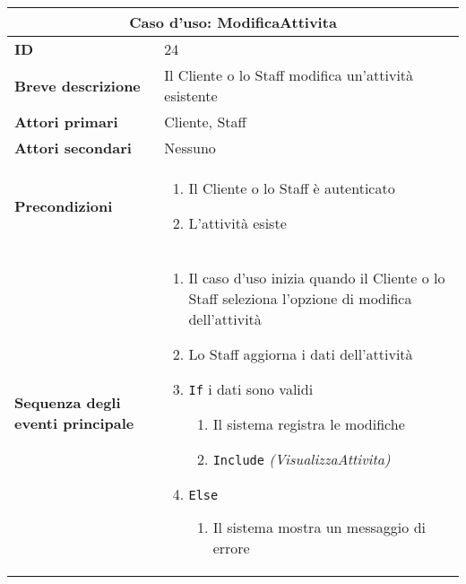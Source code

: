 \documentclass[a4paper]{report}
\begin{document}
\clearpage
\begin{table}[H]
\vspace*{-0cm}
\renewcommand{\arraystretch}{1.9}
\begin{tabular}{|p{3.9cm}|p{9.9cm}|}
\hline
\multicolumn{2}{|c|}{\textbf{Caso d’uso: ModificaAttivita}} \\ \hline
	\textbf{ID} & 24 \\ \hline
	\textbf{Breve descrizione} & Il Cliente o lo Staff modifica un’attività esistente \\ \hline
	\textbf{Attori primari} & Cliente, Staff \\ \hline
	\textbf{Attori secondari} & Nessuno \\ \hline
	\textbf{Precondizioni} & \begin{enumerate}[leftmargin=14pt,label=\arabic*.,labelsep=0.5em,topsep=0pt,partopsep=0pt,parsep=0pt,itemsep=0pt]
    \item Il Cliente o lo Staff è autenticato
    \item L’attività esiste
\end{enumerate} \\ \hline
	\textbf{Sequenza degli eventi principale} & \begin{enumerate}[leftmargin=14pt,label=\arabic*.,labelsep=0.5em,topsep=0pt,partopsep=0pt,parsep=0pt,itemsep=0pt]
    \item Il caso d'uso inizia quando il Cliente o lo Staff seleziona l'opzione di modifica dell'attività
    \item Lo Staff aggiorna i dati dell’attività
    \item \texttt{If} i dati sono validi
    \begin{enumerate}[label=\arabic{enumi}.\arabic*.,leftmargin=22pt,labelsep=0.5em,topsep=0pt,partopsep=0pt,parsep=0pt,itemsep=0pt]
        \item Il sistema registra le modifiche
        \item \texttt{Include} \textit{(VisualizzaAttivita)}
    \end{enumerate}
    \item \texttt{Else}
    \begin{enumerate}[label=\arabic{enumi}.\arabic*.,leftmargin=22pt,labelsep=0.5em,topsep=0pt,partopsep=0pt,parsep=0pt,itemsep=0pt]
        \item Il sistema mostra un messaggio di errore
    \end{enumerate}
\end{enumerate} \\ \hline

\end{tabular}
\end{table}
\end{document}
